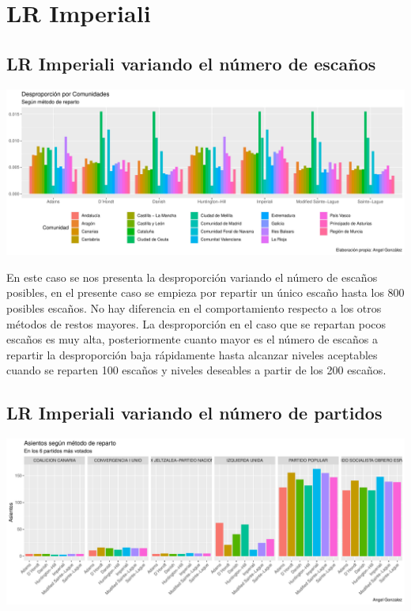 \documentclass[12pt,a4paper,]{book}
\numberwithin{dummy}{section}
\theoremstyle{ocrenumbox}
\theoremstyle{blacknumex}
\theoremstyle{blacknumbox}
\theoremstyle{ocrenum}
\theoremstyle{ocrenum}
\begin{document}
\hypertarget{lr-imperiali}{%
\section{LR Imperiali}\label{lr-imperiali}}

\hypertarget{lr-imperiali-variando-el-nuxfamero-de-escauxf1os}{%
\subsection{LR Imperiali variando el número de
escaños}\label{lr-imperiali-variando-el-nuxfamero-de-escauxf1os}}

\begin{center}\includegraphics[width=0.95\linewidth]{figurasR/unnamed-chunk-63-1} \end{center}

En este caso se nos presenta la desproporción variando el número de
escaños posibles, en el presente caso se empieza por repartir un único
escaño hasta los 800 posibles escaños. No hay diferencia en el
comportamiento respecto a los otros métodos de restos mayores. La
desproporción en el caso que se repartan pocos escaños es muy alta,
posteriormente cuanto mayor es el número de escaños a repartir la
desproporción baja rápidamente hasta alcanzar niveles aceptables cuando
se reparten 100 escaños y niveles deseables a partir de los 200 escaños.

\hypertarget{lr-imperiali-variando-el-nuxfamero-de-partidos}{%
\subsection{LR Imperiali variando el número de
partidos}\label{lr-imperiali-variando-el-nuxfamero-de-partidos}}

\begin{center}\includegraphics[width=0.95\linewidth]{figurasR/unnamed-chunk-64-1} \end{center}
\end{document}
